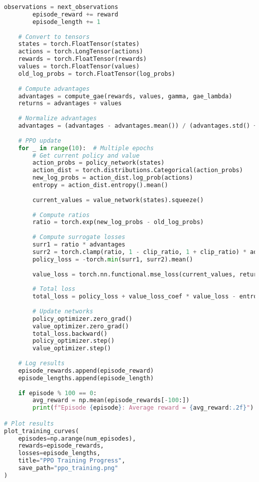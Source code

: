 \begin{lstlisting}[language=python, caption=Basic PPO Training]
        observations = next_observations
        episode_reward += reward
        episode_length += 1
    
    # Convert to tensors
    states = torch.FloatTensor(states)
    actions = torch.LongTensor(actions)
    rewards = torch.FloatTensor(rewards)
    values = torch.FloatTensor(values)
    old_log_probs = torch.FloatTensor(log_probs)
    
    # Compute advantages
    advantages = compute_gae(rewards, values, gamma, gae_lambda)
    returns = advantages + values
    
    # Normalize advantages
    advantages = (advantages - advantages.mean()) / (advantages.std() + 1e-8)
    
    # PPO update
    for _ in range(10):  # Multiple epochs
        # Get current policy and value
        action_probs = policy_network(states)
        action_dist = torch.distributions.Categorical(action_probs)
        new_log_probs = action_dist.log_prob(actions)
        entropy = action_dist.entropy().mean()
        
        current_values = value_network(states).squeeze()
        
        # Compute ratios
        ratio = torch.exp(new_log_probs - old_log_probs)
        
        # Compute surrogate losses
        surr1 = ratio * advantages
        surr2 = torch.clamp(ratio, 1 - clip_ratio, 1 + clip_ratio) * advantages
        policy_loss = -torch.min(surr1, surr2).mean()
        
        value_loss = torch.nn.functional.mse_loss(current_values, returns)
        
        # Total loss
        total_loss = policy_loss + value_loss_coef * value_loss - entropy_coef * entropy
        
        # Update networks
        policy_optimizer.zero_grad()
        value_optimizer.zero_grad()
        total_loss.backward()
        policy_optimizer.step()
        value_optimizer.step()
    
    # Log results
    episode_rewards.append(episode_reward)
    episode_lengths.append(episode_length)
    
    if episode % 100 == 0:
        avg_reward = np.mean(episode_rewards[-100:])
        print(f"Episode {episode}: Average reward = {avg_reward:.2f}")

# Plot results
plot_training_curves(
    episodes=np.arange(num_episodes),
    rewards=episode_rewards,
    losses=episode_lengths,
    title="PPO Training Progress",
    save_path="ppo_training.png"
)


\end{lstlisting}
